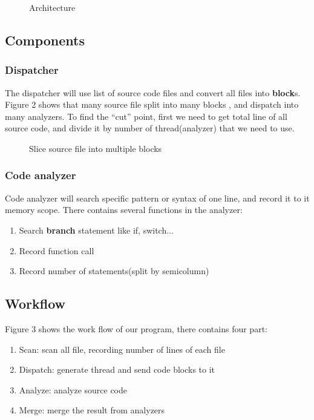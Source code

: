 \documentclass{acm_proc_article-sp}
\begin{document}
\begin{figure}
	\centering
	\caption{Architecture}
\end{figure}


\subsection{Components}
\subsubsection{Dispatcher}
	The dispatcher will use list of source code files and convert all files into
	\textbf{block}s. Figure 2 shows that many source file split into many blocks
	, and dispatch into many analyzers. To find the ``cut'' point, first we need to 
	get total line of all source code, and divide it by number of thread(analyzer)
	that we need to use.
\begin{figure}
	\centering
	\caption{Slice source file into multiple blocks}
\end{figure}
\subsubsection{Code analyzer}
	Code analyzer will search specific pattern or syntax of one line, and record 
	it to it memory scope. There contains several functions in the analyzer:
	\begin{enumerate}
		\item Search \textbf{branch} statement like if, switch...
		\item Record function call
		\item Record number of statements(split by semicolumn)
	\end{enumerate}
	
\subsection{Workflow}
	Figure 3 shows the work flow of our program, there contains four part:
	\begin{enumerate}
		\item Scan: scan all file, recording number of lines of each file
		\item Dispatch: generate thread and send code blocks to it
		\item Analyze: analyze source code
		\item Merge: merge the result from analyzers
	\end{enumerate}
\end{document}
